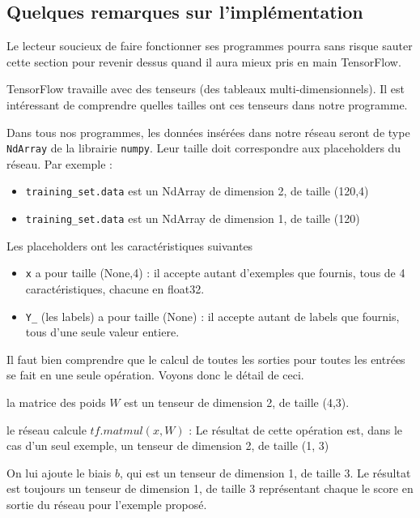 \documentclass[a4paper,11pt]{book}
\begin{document}



\subsection{Quelques remarques sur l'implémentation}
Le lecteur soucieux de faire fonctionner ses programmes pourra sans risque sauter cette section pour revenir dessus quand il aura mieux pris en main TensorFlow.


TensorFlow travaille avec des tenseurs (des tableaux multi-dimensionnels).
Il est intéressant de comprendre quelles tailles ont ces tenseurs dans notre programme.

Dans tous nos programmes, les données insérées dans notre réseau seront de type \verb+NdArray+ de la librairie \verb+numpy+. Leur taille doit correspondre aux placeholders du réseau. Par exemple :
\begin{itemize}
\item \verb+training_set.data+ est un NdArray de dimension 2, de taille (120,4)
\item \verb+training_set.data+ est un NdArray de dimension 1, de taille (120) 
\end{itemize}

Les placeholders ont les caractéristiques suivantes
\begin{itemize}
\item \verb+x+ a pour taille (None,4) : il accepte autant d'exemples que fournis, tous de 4 caractéristiques, chacune en float32.
\item \verb+Y_+ (les labels) a pour taille (None) : il accepte autant de labels que fournis, tous d'une seule valeur entiere.
\end{itemize}

Il faut bien comprendre que le calcul de toutes les sorties pour toutes les entrées se fait en une seule opération. Voyons donc le détail de ceci.

la matrice des poids $W$ est un tenseur de dimension 2, de taille (4,3).

le réseau calcule $tf.matmul(x,W)$ : Le résultat de cette opération est, dans le cas d'un seul exemple, un tenseur de dimension 2, de taille (1, 3)

On lui ajoute le biais $b$, qui est un tenseur de dimension 1, de taille 3.
Le résultat est toujours un tenseur de dimension 1, de taille 3 représentant chaque le score en sortie du réseau pour l'exemple proposé.
\end{document}
